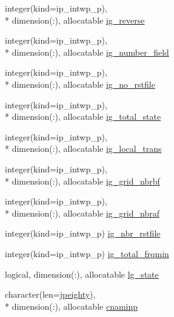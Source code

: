 \begin{DoxyCompactItemize}
\item 
integer(kind=ip\+\_\+intwp\+\_\+p), \\*
dimension(\+:), allocatable \hyperlink{classmod__oasis__namcouple_adc4dcf30da2b88fb1798dd02e7833bc1}{ig\+\_\+reverse}
\item 
integer(kind=ip\+\_\+intwp\+\_\+p), \\*
dimension(\+:), allocatable \hyperlink{classmod__oasis__namcouple_a0751f74f7ce6520d8e860b9da14d1d9d}{ig\+\_\+number\+\_\+field}
\item 
integer(kind=ip\+\_\+intwp\+\_\+p), \\*
dimension(\+:), allocatable \hyperlink{classmod__oasis__namcouple_a1cc3d37d7819c112f14b6cec03266561}{ig\+\_\+no\+\_\+rstfile}
\item 
integer(kind=ip\+\_\+intwp\+\_\+p), \\*
dimension(\+:), allocatable \hyperlink{classmod__oasis__namcouple_a7c783457d0e759e3af98b92146fa4ec3}{ig\+\_\+total\+\_\+state}
\item 
integer(kind=ip\+\_\+intwp\+\_\+p), \\*
dimension(\+:), allocatable \hyperlink{classmod__oasis__namcouple_a510a13e57f2f65d5ddc70c729d54c0f6}{ig\+\_\+local\+\_\+trans}
\item 
integer(kind=ip\+\_\+intwp\+\_\+p), \\*
dimension(\+:), allocatable \hyperlink{classmod__oasis__namcouple_ae81f2e658bbaeae20badef0fad425a69}{ig\+\_\+grid\+\_\+nbrbf}
\item 
integer(kind=ip\+\_\+intwp\+\_\+p), \\*
dimension(\+:), allocatable \hyperlink{classmod__oasis__namcouple_a8e8c38746c6c35b13d2d9b934835188c}{ig\+\_\+grid\+\_\+nbraf}
\item 
integer(kind=ip\+\_\+intwp\+\_\+p) \hyperlink{classmod__oasis__namcouple_a05148b30ca97c536b40a896153c8921f}{ig\+\_\+nbr\+\_\+rstfile}
\item 
integer(kind=ip\+\_\+intwp\+\_\+p) \hyperlink{classmod__oasis__namcouple_a839912711f8d2f44a825689e2673d0dd}{ig\+\_\+total\+\_\+frqmin}
\item 
logical, dimension(\+:), allocatable \hyperlink{classmod__oasis__namcouple_ac1be1629c1369b96a4ff08c07200a05d}{lg\+\_\+state}
\item 
character(len=\hyperlink{classmod__oasis__namcouple_a4fb10ad6e864dcbe34c4a8b02204a523}{jpeighty}), \\*
dimension(\+:), allocatable \hyperlink{classmod__oasis__namcouple_a1f6ff08cee0c3c5deb262c1447d88328}{cnaminp}

\end{DoxyCompactItemize}
